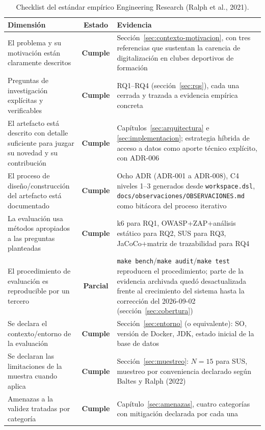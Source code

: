 \documentclass[11pt,a4paper]{article}
\newcommand{\ruta}[1]{\texttt{\footnotesize #1}}
\newcommand{\cumple}{\textcolor{okverde}{\textbf{Cumple}}}
\newcommand{\parcial}{\textcolor{alerta}{\textbf{Parcial}}}
\begin{document}
\begin{table}[htbp]
\centering
\scriptsize
\caption{Checklist del estándar empírico Engineering Research (Ralph et al., 2021).}
\label{tab:ralph-checklist}
\begin{tabular}{@{}p{6.2cm}cp{6.8cm}@{}}
\toprule
\textbf{Dimensión} & \textbf{Estado} & \textbf{Evidencia} \\
\midrule
El problema y su motivación están claramente descritos & \cumple & Sección~\ref{sec:contexto-motivacion}, con tres referencias que sustentan la carencia de digitalización en clubes deportivos de formación \\
Preguntas de investigación explícitas y verificables & \cumple & RQ1--RQ4 (sección~\ref{sec:rqs}), cada una cerrada y trazada a evidencia empírica concreta \\
El artefacto está descrito con detalle suficiente para juzgar su novedad y su contribución & \cumple & Capítulos~\ref{sec:arquitectura} e \ref{sec:implementacion}; estrategia híbrida de acceso a datos como aporte técnico explícito, con ADR-006 \\
El proceso de diseño/construcción del artefacto está documentado & \cumple & Ocho ADR (ADR-001 a ADR-008), C4 niveles 1--3 generados desde \ruta{workspace.dsl}, \ruta{docs/observaciones/OBSERVACIONES.md} como bitácora del proceso iterativo \\
La evaluación usa métodos apropiados a las preguntas planteadas & \cumple & k6 para RQ1, OWASP+ZAP+análisis estático para RQ2, SUS para RQ3, JaCoCo+matriz de trazabilidad para RQ4 \\
El procedimiento de evaluación es reproducible por un tercero & \parcial & \texttt{make bench}/\texttt{make audit}/\texttt{make test} reproducen el procedimiento; parte de la evidencia archivada quedó desactualizada frente al crecimiento del sistema hasta la corrección del 2026-09-02 (sección~\ref{sec:cobertura}) \\
Se declara el contexto/entorno de la evaluación & \cumple & Sección~\ref{sec:entorno} (o equivalente): SO, versión de Docker, JDK, estado inicial de la base de datos \\
Se declaran las limitaciones de la muestra cuando aplica & \cumple & Sección~\ref{sec:muestreo}: $N=15$ para SUS, muestreo por conveniencia declarado según Baltes y Ralph (2022) \\
Amenazas a la validez tratadas por categoría & \cumple & Capítulo~\ref{sec:amenazas}, cuatro categorías con mitigación declarada por cada una \\

\end{tabular}
\end{table}
\end{document}
